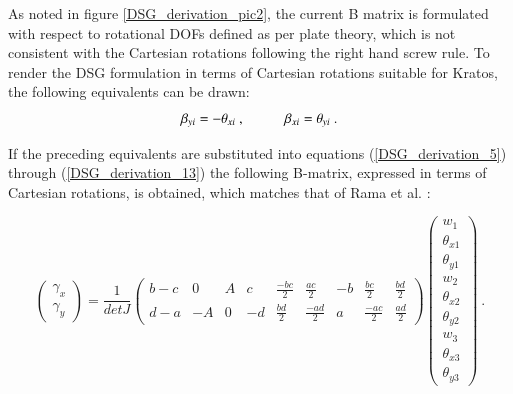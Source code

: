 As noted in figure \ref{DSG_derivation_pic2}, the current B matrix is formulated with respect to rotational DOFs defined as per plate theory, which is not consistent with the Cartesian rotations following the right hand screw rule. To render the DSG formulation in terms of Cartesian rotations suitable for Kratos, the following equivalents can be drawn:
\begin{equation} 
\beta_{yi} = -\theta_{xi}\ ,
\hspace{10mm}
\beta_{xi} = \theta_{yi}
\label{DSG_derivation_16}\ .
\end{equation}

If the preceding equivalents are substituted into equations (\ref{DSG_derivation_5}) through (\ref{DSG_derivation_13}) the following B-matrix, expressed in terms of Cartesian rotations, is obtained, which matches that of Rama et al. \cite{Ram16}:

\begin{equation} 
\begin{pmatrix}
\gamma_x \\
\gamma_y 
\end{pmatrix}
=
\frac{1}{detJ}
\begin{pmatrix}
b-c & 0 & A & c & \frac{-bc}{2} & \frac{ac}{2} & -b & \frac{bc}{2} & \frac{bd}{2} \\
d-a & -A & 0 & -d & \frac{bd}{2} & \frac{-ad}{2} & a & \frac{-ac}{2} & \frac{ad}{2}
\end{pmatrix}
\begin{pmatrix}
w_1 \\
\theta_{x1} \\
\theta_{y1} \\
w_2 \\
\theta_{x2} \\
\theta_{y2} \\
w_3 \\
\theta_{x3} \\
\theta_{y3} 
\end{pmatrix}
\label{DSG_derivation_17}\ .
\end{equation}
